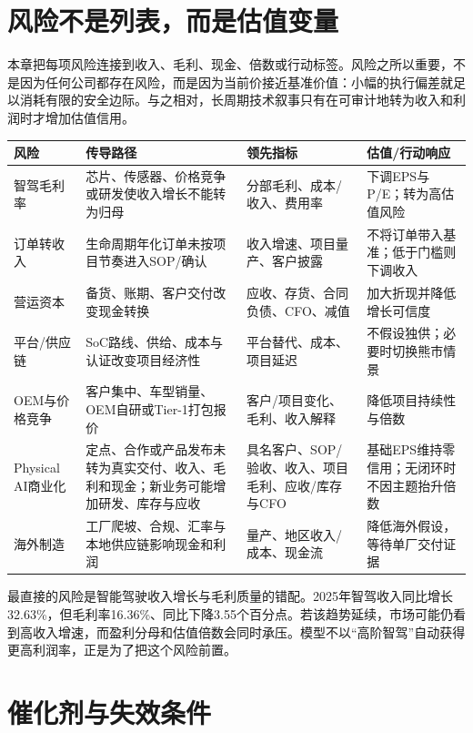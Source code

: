 \section{风险不是列表，而是估值变量}

本章把每项风险连接到收入、毛利、现金、倍数或行动标签。风险之所以重要，不是因为任何公司都存在风险，而是因为当前价接近基准价值：小幅的执行偏差就足以消耗有限的安全边际。与之相对，长周期技术叙事只有在可审计地转为收入和利润时才增加估值信用。

\begin{exhibitbox}[风险矩阵]
\small
\begin{tabularx}{\textwidth}{L{2.2cm}Y Y Y}
\toprule
风险 & 传导路径 & 领先指标 & 估值/行动响应 \\
\midrule
智驾毛利率 & 芯片、传感器、价格竞争或研发使收入增长不能转为归母 & 分部毛利、成本/收入、费用率 & 下调EPS与P/E；转为高估值风险 \\
订单转收入 & 生命周期年化订单未按项目节奏进入SOP/确认 & 收入增速、项目量产、客户披露 & 不将订单带入基准；低于门槛则下调收入 \\
营运资本 & 备货、账期、客户交付改变现金转换 & 应收、存货、合同负债、CFO、减值 & 加大折现并降低增长可信度 \\
平台/供应链 & SoC路线、供给、成本与认证改变项目经济性 & 平台替代、成本、项目延迟 & 不假设独供；必要时切换熊市情景 \\
OEM与价格竞争 & 客户集中、车型销量、OEM自研或Tier-1打包报价 & 客户/项目变化、毛利、收入解释 & 降低项目持续性与倍数 \\
Physical AI商业化 & 定点、合作或产品发布未转为真实交付、收入、毛利和现金；新业务可能增加研发、库存与应收 & 具名客户、SOP/验收、收入、项目毛利、应收/库存与CFO & 基础EPS维持零信用；无闭环时不因主题抬升倍数 \\
海外制造 & 工厂爬坡、合规、汇率与本地供应链影响现金和利润 & 量产、地区收入/成本、现金流 & 降低海外假设，等待单厂交付证据 \\
\bottomrule
\end{tabularx}
\end{exhibitbox}

最直接的风险是智能驾驶收入增长与毛利质量的错配。2025年智驾收入同比增长32.63\%，但毛利率16.36\%、同比下降3.55个百分点。若该趋势延续，市场可能仍看到高收入增速，而盈利分母和估值倍数会同时承压。模型不以“高阶智驾”自动获得更高利润率，正是为了把这个风险前置。

\section{催化剂与失效条件}

